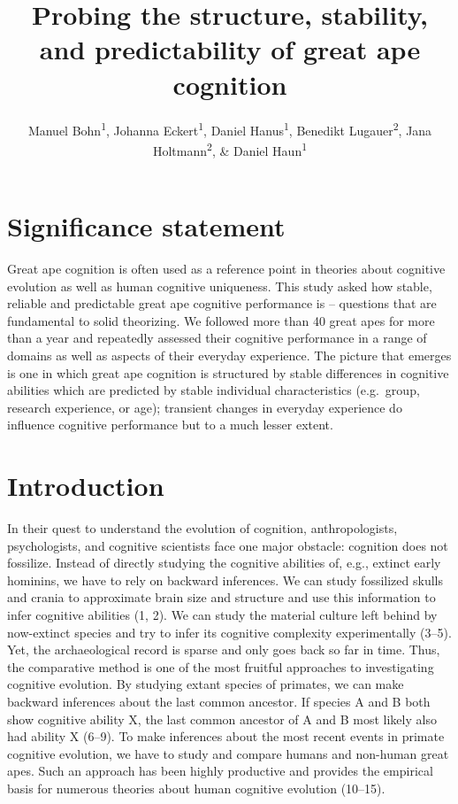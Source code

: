 \documentclass[
  man,floatsintext]{apa6}
\title{Probing the structure, stability, and predictability of great ape cognition}
\author{Manuel Bohn\textsuperscript{1}, Johanna Eckert\textsuperscript{1}, Daniel Hanus\textsuperscript{1}, Benedikt Lugauer\textsuperscript{2}, Jana Holtmann\textsuperscript{2}, \& Daniel Haun\textsuperscript{1}}
\date{}
\affiliation{\vspace{0.5cm}\textsuperscript{1} Department of Comparative Cultural Psychology, Max Planck Institute for Evolutionary Anthropology, Leipzig, Germany\\\textsuperscript{2} Psychologische Hochschule Berlin, Berlin, Germany}
\begin{document}
\maketitle

\hypertarget{significance-statement}{%
\section{Significance statement}\label{significance-statement}}

Great ape cognition is often used as a reference point in theories about cognitive evolution as well as human cognitive uniqueness. This study asked how stable, reliable and predictable great ape cognitive performance is -- questions that are fundamental to solid theorizing. We followed more than 40 great apes for more than a year and repeatedly assessed their cognitive performance in a range of domains as well as aspects of their everyday experience. The picture that emerges is one in which great ape cognition is structured by stable differences in cognitive abilities which are predicted by stable individual characteristics (e.g.~group, research experience, or age); transient changes in everyday experience do influence cognitive performance but to a much lesser extent.

\hypertarget{introduction}{%
\section{Introduction}\label{introduction}}

In their quest to understand the evolution of cognition, anthropologists, psychologists, and cognitive scientists face one major obstacle: cognition does not fossilize. Instead of directly studying the cognitive abilities of, e.g., extinct early hominins, we have to rely on backward inferences. We can study fossilized skulls and crania to approximate brain size and structure and use this information to infer cognitive abilities (1, 2). We can study the material culture left behind by now-extinct species and try to infer its cognitive complexity experimentally (3--5). Yet, the archaeological record is sparse and only goes back so far in time. Thus, the comparative method is one of the most fruitful approaches to investigating cognitive evolution. By studying extant species of primates, we can make backward inferences about the last common ancestor. If species A and B both show cognitive ability X, the last common ancestor of A and B most likely also had ability X (6--9). To make inferences about the most recent events in primate cognitive evolution, we have to study and compare humans and non-human great apes. Such an approach has been highly productive and provides the empirical basis for numerous theories about human cognitive evolution (10--15).
\end{document}
